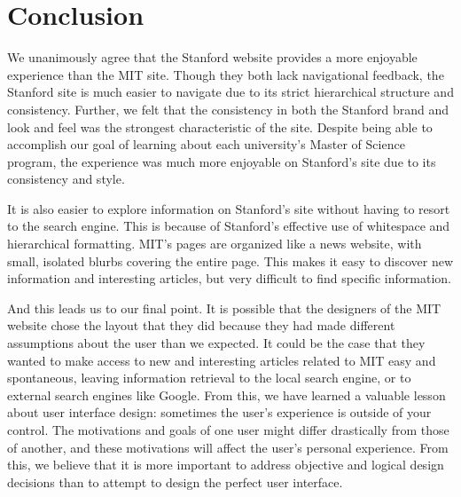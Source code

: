 \section*{Conclusion}

We unanimously agree that the Stanford website provides a more enjoyable experience
than the MIT site. Though they both lack navigational feedback, the
Stanford site is much easier to navigate due to its strict hierarchical structure
and consistency. Further, we felt that the consistency in both the Stanford brand
and look and feel was the strongest characteristic of the site. Despite being able
to accomplish our goal of learning about each university's
Master of Science program, the experience was much more enjoyable on Stanford's
site due to its consistency and style.

It is also easier to explore information on Stanford's site without having to
resort to the search engine. This is because of Stanford's effective use of
whitespace and hierarchical formatting. MIT's pages are organized like a
news website, with small, isolated blurbs covering the entire page. This makes
it easy to discover new information and interesting articles, but very
difficult to find specific information.

And this leads us to our final point. It is possible that the designers of the
MIT website chose the layout that they did because they had made different
assumptions about the user than we expected. It could be the case that they
wanted to make access to new and interesting articles related to MIT easy
and spontaneous, leaving information retrieval to the local search engine, or
to external search engines like Google. From this, we have learned a valuable lesson
about user interface design: sometimes the user's experience is outside of
your control. The motivations and goals of one user might differ drastically
from those of another, and these motivations will affect the user's personal
experience. From this, we believe that it is more important to address objective and
logical design decisions than to attempt to design the perfect user interface.